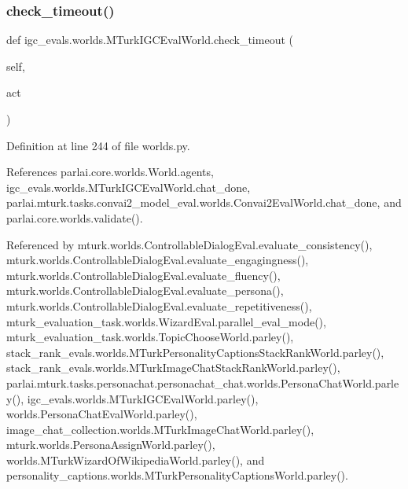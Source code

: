 \subsubsection{\texorpdfstring{check\+\_\+timeout()}{check\_timeout()}}
{\footnotesize\ttfamily def igc\+\_\+evals.\+worlds.\+M\+Turk\+I\+G\+C\+Eval\+World.\+check\+\_\+timeout (\begin{DoxyParamCaption}\item[{}]{self,  }\item[{}]{act }\end{DoxyParamCaption})}



Definition at line 244 of file worlds.\+py.



References parlai.\+core.\+worlds.\+World.\+agents, igc\+\_\+evals.\+worlds.\+M\+Turk\+I\+G\+C\+Eval\+World.\+chat\+\_\+done, parlai.\+mturk.\+tasks.\+convai2\+\_\+model\+\_\+eval.\+worlds.\+Convai2\+Eval\+World.\+chat\+\_\+done, and parlai.\+core.\+worlds.\+validate().



Referenced by mturk.\+worlds.\+Controllable\+Dialog\+Eval.\+evaluate\+\_\+consistency(), mturk.\+worlds.\+Controllable\+Dialog\+Eval.\+evaluate\+\_\+engagingness(), mturk.\+worlds.\+Controllable\+Dialog\+Eval.\+evaluate\+\_\+fluency(), mturk.\+worlds.\+Controllable\+Dialog\+Eval.\+evaluate\+\_\+persona(), mturk.\+worlds.\+Controllable\+Dialog\+Eval.\+evaluate\+\_\+repetitiveness(), mturk\+\_\+evaluation\+\_\+task.\+worlds.\+Wizard\+Eval.\+parallel\+\_\+eval\+\_\+mode(), mturk\+\_\+evaluation\+\_\+task.\+worlds.\+Topic\+Choose\+World.\+parley(), stack\+\_\+rank\+\_\+evals.\+worlds.\+M\+Turk\+Personality\+Captions\+Stack\+Rank\+World.\+parley(), stack\+\_\+rank\+\_\+evals.\+worlds.\+M\+Turk\+Image\+Chat\+Stack\+Rank\+World.\+parley(), parlai.\+mturk.\+tasks.\+personachat.\+personachat\+\_\+chat.\+worlds.\+Persona\+Chat\+World.\+parley(), igc\+\_\+evals.\+worlds.\+M\+Turk\+I\+G\+C\+Eval\+World.\+parley(), worlds.\+Persona\+Chat\+Eval\+World.\+parley(), image\+\_\+chat\+\_\+collection.\+worlds.\+M\+Turk\+Image\+Chat\+World.\+parley(), mturk.\+worlds.\+Persona\+Assign\+World.\+parley(), worlds.\+M\+Turk\+Wizard\+Of\+Wikipedia\+World.\+parley(), and personality\+\_\+captions.\+worlds.\+M\+Turk\+Personality\+Captions\+World.\+parley().

